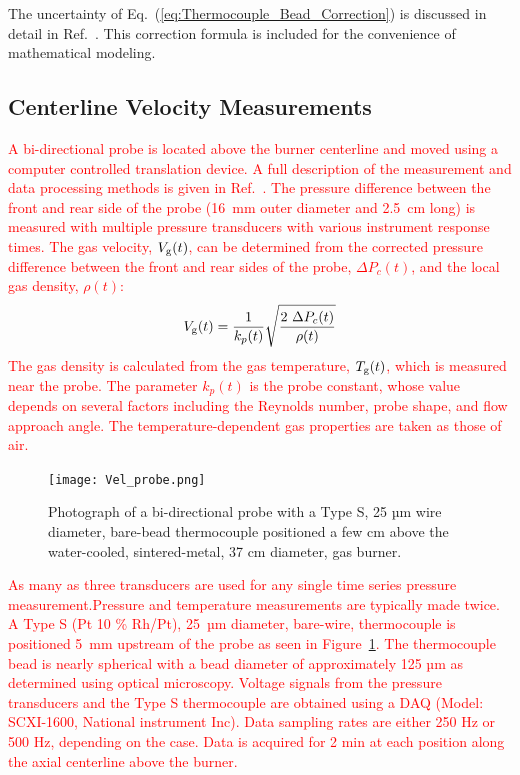 \documentclass[12pt]{article}
\begin{document}
The uncertainty of Eq.~(\ref{eq:Thermocouple_Bead_Correction}) is discussed in detail in Ref.~\cite{Sung2019}. This correction formula is included for the convenience of mathematical modeling.

\subsection{Centerline Velocity Measurements}
\label{ssec:Velocity_Measurements}
\textcolor{red}{A bi-directional probe is located above the burner centerline and moved using a computer controlled translation device. A full description of the measurement and data processing methods is given in Ref.~\cite{Sung2021}. The pressure difference between the front and rear side of the probe (16~mm outer diameter and 2.5~cm  long) is measured with multiple pressure transducers with various instrument response times. The gas velocity, $V_{\rm{g}}(t)$, can be determined from the corrected pressure difference between the front and rear sides of the probe, $\Delta P_{c}(t)$, and the local gas density, $\rho(t)$:}
\begin{equation}\label{eq:Vel_g}
V_{\rm{g}}(t) = \frac{1}{k_p(t)}\sqrt{\frac{2~\Delta P_{c}(t)}{\rho(t)}}
\end{equation}
\textcolor{red}{The gas density is calculated from the gas temperature, $ {T_{\rm g}(t)}$, which is measured near the probe. The parameter $k_p(t)$ is the probe constant, whose value depends on several factors including the Reynolds number, probe shape, and flow approach angle. The temperature-dependent gas properties are taken as those of air.}
\begin{figure}[h!]
	\centering
\texttt{[image: Vel\_probe.png]}
	\caption[Photograph of a bi-directional probe]{Photograph of a bi-directional probe with a Type S, 25 µm wire diameter, bare-bead thermocouple positioned a few cm above the water-cooled, sintered-metal, 37 cm diameter, gas burner.}
	\label{fig:Vel_Probe}
\end{figure}
\textcolor{red}{As many as three transducers are used for any single time series pressure measurement.Pressure and temperature measurements are typically made twice. A Type S (Pt 10 \% Rh/Pt), 25~µm diameter, bare-wire, thermocouple is positioned 5~mm upstream of the probe as seen in Figure~\ref{fig:Vel_Probe}. The thermocouple bead is nearly spherical with a bead diameter of approximately 125 µm as determined using optical microscopy. Voltage signals from the pressure transducers and the Type S thermocouple are obtained using a DAQ (Model: SCXI-1600, National instrument Inc). Data sampling rates are either 250 Hz or 500 Hz, depending on the case. Data is acquired for 2 min at each position along the axial centerline above the burner.}
\end{document}
